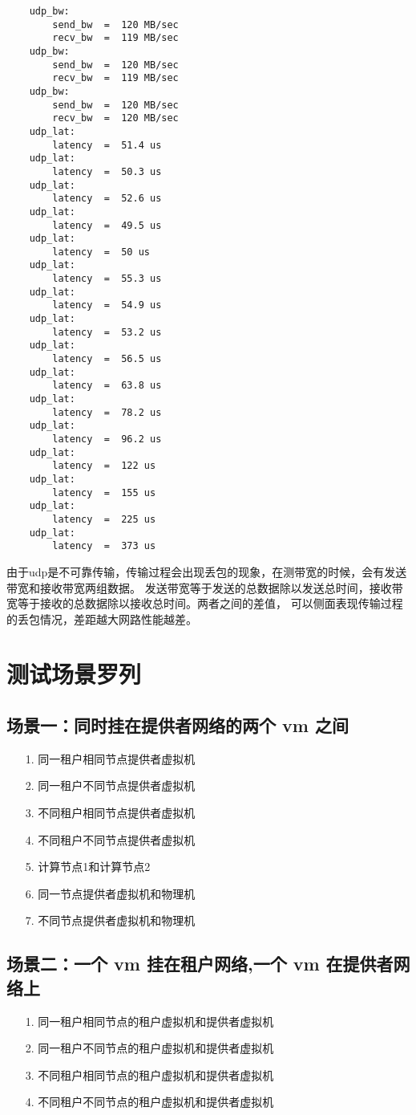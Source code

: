 \documentclass[a4paper,left=1.5cm,right=1.5cm,11pt]{article}
\begin{document}
\begin{itemize}
\begin{lstlisting}
	udp_bw:
		send_bw  =  120 MB/sec
		recv_bw  =  119 MB/sec
	udp_bw:
		send_bw  =  120 MB/sec
		recv_bw  =  119 MB/sec
	udp_bw:
		send_bw  =  120 MB/sec
		recv_bw  =  120 MB/sec
	udp_lat:
		latency  =  51.4 us
	udp_lat:
		latency  =  50.3 us
	udp_lat:
		latency  =  52.6 us
	udp_lat:
		latency  =  49.5 us
	udp_lat:
		latency  =  50 us
	udp_lat:
		latency  =  55.3 us
	udp_lat:
		latency  =  54.9 us
	udp_lat:
		latency  =  53.2 us
	udp_lat:
		latency  =  56.5 us
	udp_lat:
		latency  =  63.8 us
	udp_lat:
		latency  =  78.2 us
	udp_lat:
		latency  =  96.2 us
	udp_lat:
		latency  =  122 us
	udp_lat:
		latency  =  155 us
	udp_lat:
		latency  =  225 us
	udp_lat:
		latency  =  373 us
	\end{lstlisting}\par
	由于udp是不可靠传输，传输过程会出现丢包的现象，在测带宽的时候，会有发送带宽和接收带宽两组数据。
	发送带宽等于发送的总数据除以发送总时间，接收带宽等于接收的总数据除以接收总时间。两者之间的差值，
	可以侧面表现传输过程的丢包情况，差距越大网路性能越差。
\end{itemize}

\section{测试场景罗列}
\subsection{场景一：同时挂在提供者网络的两个 vm 之间}
\begin{itemize}
	\item[1.]同一租户相同节点提供者虚拟机
	\item[2.]同一租户不同节点提供者虚拟机
	\item[3.]不同租户相同节点提供者虚拟机
	\item[4.]不同租户不同节点提供者虚拟机
	\item[5.]计算节点1和计算节点2
	\item[6.]同一节点提供者虚拟机和物理机
	\item[7.]不同节点提供者虚拟机和物理机
\end{itemize}
\subsection{场景二：一个 vm 挂在租户网络,一个 vm 在提供者网络上}
\begin{itemize}
	\item[1.]同一租户相同节点的租户虚拟机和提供者虚拟机
	\item[2.]同一租户不同节点的租户虚拟机和提供者虚拟机
	\item[3.]不同租户相同节点的租户虚拟机和提供者虚拟机
	\item[4.]不同租户不同节点的租户虚拟机和提供者虚拟机
\end{itemize}
\end{document}
